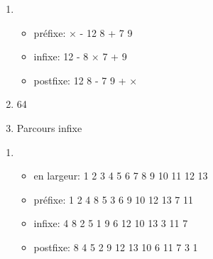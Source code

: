 \documentclass[a4paper,11pt]{article}
\begin{document}
\begin{Form}
    \begin{exo}
        \begin{enumerate}
            \item \begin{itemize}
                      \item préfixe: × - 12 8 + 7 9
                      \item infixe: 12 - 8 × 7 + 9
                      \item postfixe: 12 8 - 7 9 + ×
                  \end{itemize}
            \item 64
            \item Parcours infixe
        \end{enumerate}
    \end{exo}
    \begin{exo}
        \begin{enumerate}
            \item
                  \begin{itemize}
                      \item en largeur: 1 2 3 4 5 6 7 8 9 10 11 12 13
                      \item préfixe: 1 2 4 8 5 3 6 9 10 12 13 7 11
                      \item infixe: 4 8 2 5 1 9 6 12 10 13 3 11 7
                      \item postfixe: 8 4 5 2 9 12 13 10 6 11 7 3 1


\end{itemize}
\end{enumerate}
\end{exo}
\end{Form}
\end{document}
